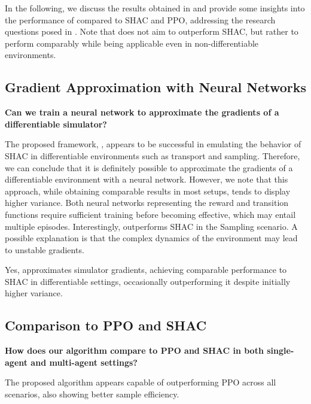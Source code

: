 In the following, we discuss the results obtained in  and provide some insights into the performance of \fname{} compared to SHAC and PPO, addressing the research questions posed in . Note that \fname{} does not aim to outperform SHAC, but rather to perform comparably while being applicable even in non-differentiable environments.

\subsection{Gradient Approximation with Neural Networks}
\begin{rqbox}
\textbf{Can we train a neural network to approximate the gradients of a differentiable simulator?}
\end{rqbox}

The proposed framework, \fname{}, appears to be successful in emulating the behavior of SHAC in differentiable environments such as transport and sampling. Therefore, we can conclude that it is definitely possible to approximate the gradients of a differentiable environment with a neural network. However, we note that this approach, while obtaining comparable results in most setups, tends to display higher variance. Both neural networks representing the reward and transition functions require sufficient training before becoming effective, which may entail multiple episodes. Interestingly, \fname{} outperforms SHAC in the Sampling scenario. A possible explanation is that the complex dynamics of the environment may lead to unstable gradients.

\begin{replybox}
Yes, \fname{} approximates simulator gradients, achieving comparable performance to SHAC in differentiable settings, occasionally outperforming it despite initially higher variance.
\end{replybox}

\subsection{Comparison to PPO and SHAC}
\begin{rqbox}
\textbf{How does our algorithm compare to PPO and SHAC in both single-agent and multi-agent settings?}
\end{rqbox}

The proposed algorithm appears capable of outperforming PPO across all scenarios, also showing better sample efficiency.


